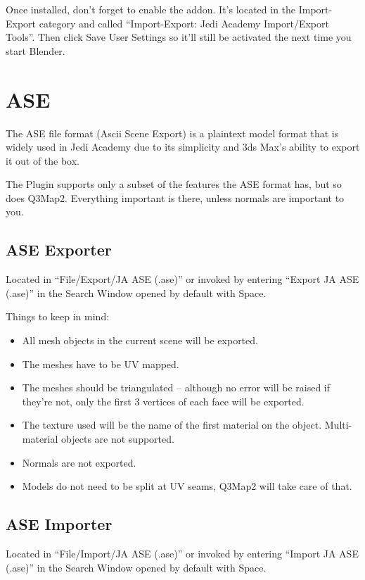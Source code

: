 \documentclass[a4paper,10pt]{article}
\begin{document}
 Once installed, don't forget to enable the addon. It's located in the Import-Export category and called
 ``Import-Export: Jedi Academy Import/Export Tools''. Then click Save User Settings so it'll still be activated
 the next time you start Blender.
 
 \section{ASE}
 
 The ASE file format (Ascii Scene Export) is a plaintext model format that is widely used in Jedi Academy due
 to its simplicity and 3ds Max's ability to export it out of the box.
 
 The Plugin supports only a subset of the features the ASE format has, but so does Q3Map2. Everything important
 is there, unless normals are important to you.
 
 \subsection{ASE Exporter}
 
 Located in ``File/Export/JA ASE (.ase)'' or invoked by entering ``Export JA ASE (.ase)'' in the Search Window
 opened by default with Space.
 
 Things to keep in mind:
 \begin{itemize}
  \item All mesh objects in the current scene will be exported.
  \item The meshes have to be UV mapped.
  \item The meshes should be triangulated -- although no error will be raised if they're not, only the first
  3 vertices of each face will be exported.
  \item The texture used will be the name of the first material on the object. Multi-material objects are not
  supported.
  \item Normals are not exported.
  \item Models do not need to be split at UV seams, Q3Map2 will take care of that.
 \end{itemize}
 
 \subsection{ASE Importer}
 
 Located in ``File/Import/JA ASE (.ase)'' or invoked by entering ``Import JA ASE (.ase)'' in the Search Window
 opened by default with Space.
 
\end{document}
